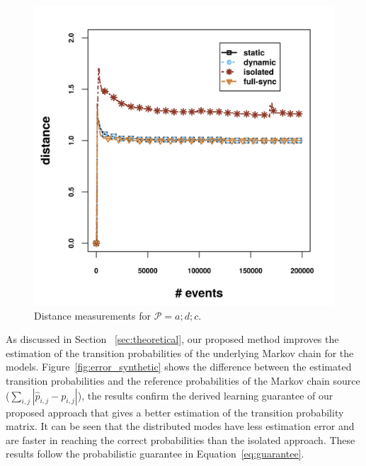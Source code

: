\begin{center}
	\centering
	\begin{figure}[H]
		
		\includegraphics[width=\textwidth,keepaspectratio]{chapters/figures/synthetic/new/distance_synthetic.png}
		
		\caption{Distance measurements for $\mathcal{P}=a;d;c$.}
		\label{fig:distance_synth}
	\end{figure}
\end{center}

As discussed in Section ~\ref{sec:theoretical}, our proposed method improves the estimation of the transition probabilities of the underlying Markov chain for the \pmcmr models. Figure~\ref{fig:error_synthetic} shows the difference between the estimated transition probabilities and the reference probabilities of the Markov chain source ($\sum_{i,j} |\hat{p}_{i,j} - {p}_{i,j}|$), the results confirm the derived learning guarantee of our proposed approach that gives a better estimation of the transition probability matrix. It can be seen that the distributed modes have less estimation error and are faster in reaching the correct probabilities than the isolated approach. These results follow the probabilistic guarantee in Equation~\ref{eq:guarantee}.

